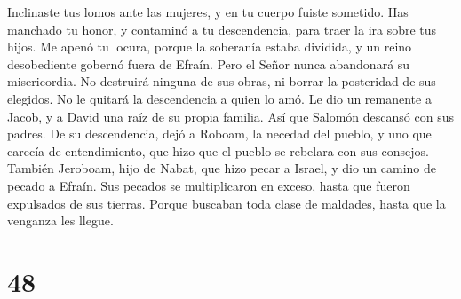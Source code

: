 Inclinaste tus lomos ante las mujeres, y en tu cuerpo
fuiste sometido.  Has manchado tu honor, y contaminó a tu
descendencia, para traer la ira sobre tus hijos. Me apenó tu locura,
 porque la soberanía estaba dividida, y un reino
desobediente gobernó fuera de Efraín.  Pero el Señor
nunca abandonará su misericordia. No destruirá ninguna de sus obras, ni
borrar la posteridad de sus elegidos. No le quitará la descendencia a
quien lo amó. Le dio un remanente a Jacob, y a David una raíz de su
propia familia.  Así que Salomón descansó con sus padres.
De su descendencia, dejó a Roboam, la necedad del pueblo, y uno que
carecía de entendimiento, que hizo que el pueblo se rebelara con sus
consejos. También Jeroboam, hijo de Nabat, que hizo pecar a Israel, y
dio un camino de pecado a Efraín.  Sus pecados se
multiplicaron en exceso, hasta que fueron expulsados de sus tierras.
 Porque buscaban toda clase de maldades, hasta que la
venganza les llegue.

\hypertarget{section-47}{%
\section{48}\label{section-47}}

